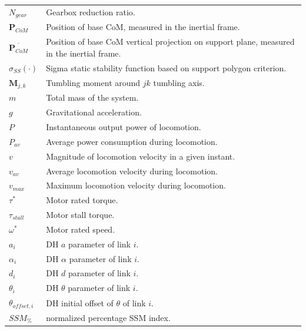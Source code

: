 \begin{table}[H]
    \begin{tabular}{ll}
        ${N_{gear}}$ & Gearbox reduction ratio.\\[2pt]
        $\mathbf{P}_{CoM}$ &Position of base CoM, measured in the inertial frame.\\[2pt]        
        $\overline{\mathbf{P}_{CoM}}$ &Position of base CoM vertical projection on support plane, measured in the inertial frame.\\[2pt]
        $\sigma_{SS}(\cdot)$ & Sigma static stability function based on support polygon criterion.\\[2pt]
        $\mathbf{M}_{j,k}$ & Tumbling moment around $jk$ tumbling axis.\\[2pt]
        $m$ & Total mass of the system.\\[2pt]
        $g$ & Gravitational acceleration.\\[2pt]
        $P$ & Instantaneous output power of locomotion.  \\[2pt]
        $P_{av}$ & Average power consumption during locomotion. \\[2pt]
        $v$ & Magnitude of locomotion velocity in a given instant. \\[2pt]
        $v_{av}$ & Average locomotion velocity during locomotion. \\[2pt]
        $v_{max}$ & Maximum locomotion velocity during locomotion. \\[2pt]
        $\tau^*$ & Motor rated torque. \\[2pt]
        $\tau_{stall}$ & Motor stall torque. \\[2pt]
        $\omega^*$ & Motor rated speed. \\[2pt]
        $a_i$ & DH $a$ parameter of link $i$. \\[2pt]
        $\alpha_i$ & DH $\alpha$ parameter of link $i$. \\[2pt]
        $d_i$ & DH $d$ parameter of link $i$. \\[2pt]
        $\theta_i$ & DH $\theta$ parameter of link $i$. \\[2pt]
        $\theta_{offset,i}$ & DH initial offset of $\theta$ of link $i$. \\[2pt]
        $SSM_\%$ & normalized percentage SSM index. 
        
    \end{tabular}
\end{table}